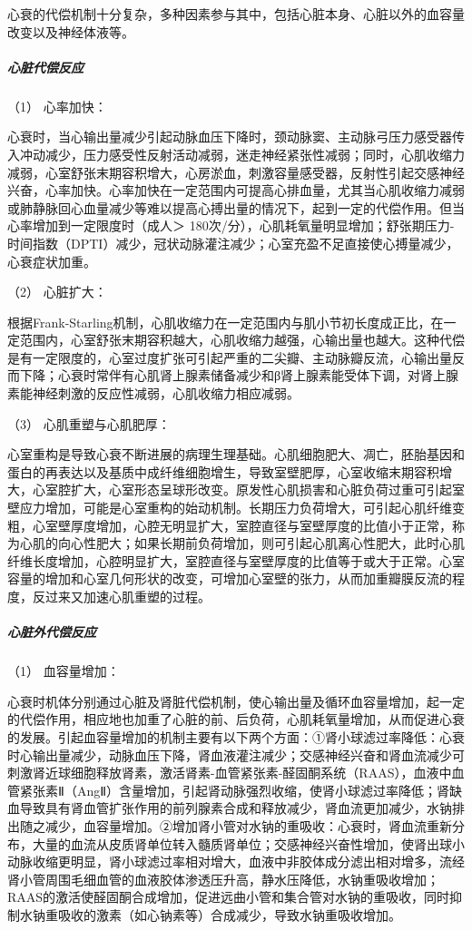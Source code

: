 心衰的代偿机制十分复杂，多种因素参与其中，包括心脏本身、心脏以外的血容量改变以及神经体液等。

\subparagraph{心脏代偿反应}

\hypertarget{text00072.htmlux5cux23CHP3-3-1-2-2-1-1}{}
（1） 心率加快：

心衰时，当心输出量减少引起动脉血压下降时，颈动脉窦、主动脉弓压力感受器传入冲动减少，压力感受性反射活动减弱，迷走神经紧张性减弱；同时，心肌收缩力减弱，心室舒张末期容积增大，心房淤血，刺激容量感受器，反射性引起交感神经兴奋，心率加快。心率加快在一定范围内可提高心排血量，尤其当心肌收缩力减弱或肺静脉回心血量减少等难以提高心搏出量的情况下，起到一定的代偿作用。但当心率增加到一定限度时（成人＞
180次/分），心肌耗氧量明显增加；舒张期压力-时间指数（DPTI）减少，冠状动脉灌注减少；心室充盈不足直接使心搏量减少，心衰症状加重。

\hypertarget{text00072.htmlux5cux23CHP3-3-1-2-2-1-2}{}
（2） 心脏扩大：

根据Frank-Starling机制，心肌收缩力在一定范围内与肌小节初长度成正比，在一定范围内，心室舒张末期容积越大，心肌收缩力越强，心输出量也越大。这种代偿是有一定限度的，心室过度扩张可引起严重的二尖瓣、主动脉瓣反流，心输出量反而下降；心衰时常伴有心肌肾上腺素储备减少和β肾上腺素能受体下调，对肾上腺素能神经刺激的反应性减弱，心肌收缩力相应减弱。

\hypertarget{text00072.htmlux5cux23CHP3-3-1-2-2-1-3}{}
（3） 心肌重塑与心肌肥厚：

心室重构是导致心衰不断进展的病理生理基础。心肌细胞肥大、凋亡，胚胎基因和蛋白的再表达以及基质中成纤维细胞增生，导致室壁肥厚，心室收缩末期容积增大，心室腔扩大，心室形态呈球形改变。原发性心肌损害和心脏负荷过重可引起室壁应力增加，可能是心室重构的始动机制。长期压力负荷增大，可引起心肌纤维变粗，心室壁厚度增加，心腔无明显扩大，室腔直径与室壁厚度的比值小于正常，称为心肌的向心性肥大；如果长期前负荷增加，则可引起心肌离心性肥大，此时心肌纤维长度增加，心腔明显扩大，室腔直径与室壁厚度的比值等于或大于正常。心室容量的增加和心室几何形状的改变，可增加心室壁的张力，从而加重瓣膜反流的程度，反过来又加速心肌重塑的过程。

\subparagraph{心脏外代偿反应}

\hypertarget{text00072.htmlux5cux23CHP3-3-1-2-2-2-1}{}
（1） 血容量增加：

心衰时机体分别通过心脏及肾脏代偿机制，使心输出量及循环血容量增加，起一定的代偿作用，相应地也加重了心脏的前、后负荷，心肌耗氧量增加，从而促进心衰的发展。引起血容量增加的机制主要有以下两个方面：①肾小球滤过率降低：心衰时心输出量减少，动脉血压下降，肾血液灌注减少；交感神经兴奋和肾血流减少可刺激肾近球细胞释放肾素，激活肾素-血管紧张素-醛固酮系统（RAAS），血液中血管紧张素Ⅱ（AngⅡ）含量增加，引起肾动脉强烈收缩，使肾小球滤过率降低；肾缺血导致具有肾血管扩张作用的前列腺素合成和释放减少，肾血流更加减少，水钠排出随之减少，血容量增加。②增加肾小管对水钠的重吸收：心衰时，肾血流重新分布，大量的血流从皮质肾单位转入髓质肾单位；交感神经兴奋性增加，使肾出球小动脉收缩更明显，肾小球滤过率相对增大，血液中非胶体成分滤出相对增多，流经肾小管周围毛细血管的血液胶体渗透压升高，静水压降低，水钠重吸收增加；RAAS的激活使醛固酮合成增加，促进远曲小管和集合管对水钠的重吸收，同时抑制水钠重吸收的激素（如心钠素等）合成减少，导致水钠重吸收增加。

